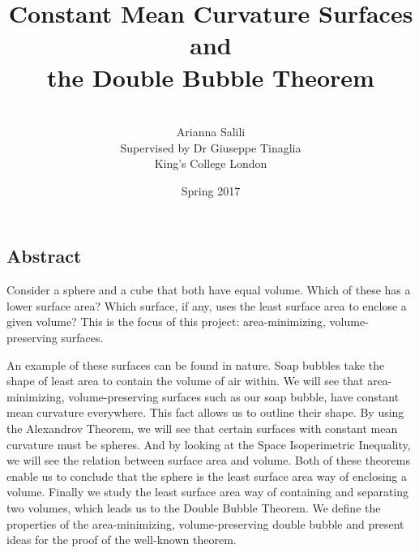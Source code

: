 \documentclass[a4paper,12pt]{report}
\begin{document}
\title{\bf Constant Mean Curvature Surfaces and\\
the Double Bubble Theorem}
\author{ \\ Arianna Salili \\ Supervised by Dr Giuseppe Tinaglia \\ King's College London}
\date{Spring 2017}


\maketitle

\chapter*{ }

\section*{Abstract}

Consider a sphere and a cube that both have equal volume. Which of these has a lower surface area? Which surface, if any, uses the least surface area to enclose a given volume? This is the focus of this project: area-minimizing, volume-preserving surfaces.\par 
\hspace{-0.66cm}An example of these surfaces can be found in nature. Soap bubbles take the shape of least area to contain the volume of air within. We will see that area-minimizing, volume-preserving surfaces such as our soap bubble, have constant mean curvature everywhere. This fact allows us to outline their shape. By using the Alexandrov Theorem, we will see that certain surfaces with constant mean curvature must be spheres. And  by looking at the Space Isoperimetric Inequality, we will see the relation between surface area and volume. Both of these theorems enable us to conclude that the sphere is the least surface area way of enclosing a volume. Finally we study the least surface area way of containing and separating two volumes, which leads us to the Double Bubble Theorem. We define the properties of the area-minimizing, volume-preserving double bubble and present ideas for the proof of the well-known theorem.


\chapter*{ }
\end{document}

